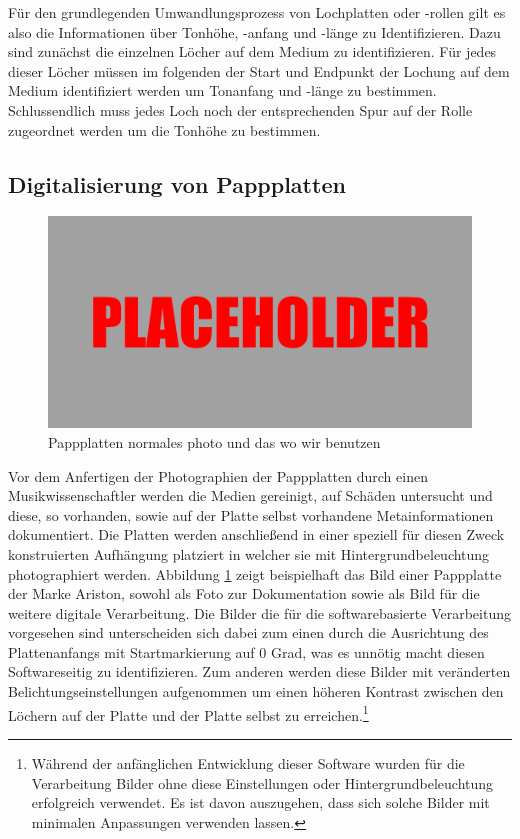 Für den grundlegenden Umwandlungsprozess von Lochplatten oder -rollen gilt es also die Informationen über Tonhöhe, -anfang und -länge zu Identifizieren.
Dazu sind zunächst die einzelnen Löcher auf dem Medium zu identifizieren.
Für jedes dieser Löcher müssen im folgenden der Start und Endpunkt der Lochung auf dem Medium identifiziert werden um Tonanfang und -länge zu bestimmen.
Schlussendlich muss jedes Loch noch der entsprechenden Spur auf der Rolle zugeordnet werden um die Tonhöhe zu bestimmen.

\subsection{Digitalisierung von Pappplatten}

\begin{figure}[t]
    \centering
    \includegraphics[width=\textwidth]{graphics/placeholder.png}
    \caption{Pappplatten normales photo und das wo wir benutzen}
    \label{pappplattenphotos}
\end{figure}

Vor dem Anfertigen der Photographien der Pappplatten durch einen Musikwissenschaftler werden die Medien gereinigt, auf Schäden untersucht und diese, so vorhanden, sowie auf der Platte selbst vorhandene Metainformationen dokumentiert.
Die Platten werden anschließend in einer speziell für diesen Zweck konstruierten Aufhängung platziert in welcher sie mit Hintergrundbeleuchtung photographiert werden.
Abbildung \ref{pappplattenphotos} zeigt beispielhaft das Bild einer Pappplatte der Marke Ariston, sowohl als Foto zur Dokumentation sowie als Bild für die weitere digitale Verarbeitung.
Die Bilder die für die softwarebasierte Verarbeitung vorgesehen sind unterscheiden sich dabei zum einen durch die Ausrichtung des Plattenanfangs mit Startmarkierung auf 0 Grad, was es unnötig macht diesen Softwareseitig zu identifizieren.
Zum anderen werden diese Bilder mit veränderten Belichtungseinstellungen aufgenommen um einen höheren Kontrast zwischen den Löchern auf der Platte und der Platte selbst zu erreichen.\footnote{Während der anfänglichen Entwicklung dieser Software wurden für die Verarbeitung Bilder ohne diese Einstellungen oder Hintergrundbeleuchtung erfolgreich verwendet. Es ist davon auszugehen, dass sich solche Bilder mit minimalen Anpassungen verwenden lassen.}

